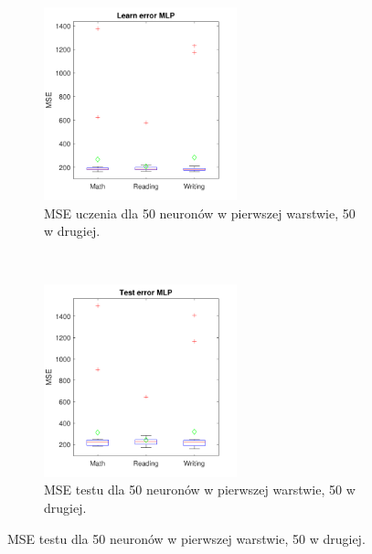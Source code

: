 \documentclass[12pt]{article}
\begin{document}
\begin{figure}[H]
\centering
\begin{subfigure}[t]{0.48\textwidth} 
\centering
\includegraphics[height=2.2in]{logsig_tansig_tansig_20_learnBoxplot.pdf}
\caption{MSE uczenia dla  50 neuronów w pierwszej warstwie, 50 w drugiej.}
\end{subfigure}
~~
\begin{subfigure}[t]{0.48\textwidth} 
\centering
\includegraphics[height=2.2in]{logsig_tansig_tansig_20_testBoxplot.pdf}
\caption{MSE testu dla  50 neuronów w pierwszej warstwie, 50 w drugiej.}
\end{subfigure}


\end{figure}
\end{document}
